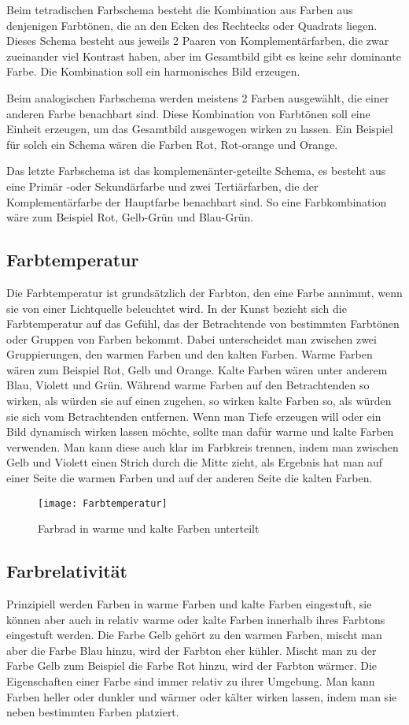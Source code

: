 Beim tetradischen Farbschema besteht die Kombination aus Farben aus denjenigen Farbtönen, die an den Ecken des Rechtecks oder Quadrats liegen. Dieses Schema besteht aus jeweils 2 Paaren von Komplementärfarben, die zwar zueinander viel Kontrast haben, aber im Gesamtbild gibt es keine sehr dominante Farbe. Die Kombination soll ein harmonisches Bild erzeugen.

Beim analogischen Farbschema werden meistens 2 Farben ausgewählt, die einer anderen Farbe benachbart sind. Diese Kombination von Farbtönen soll eine Einheit erzeugen, um das Gesamtbild ausgewogen wirken zu lassen. Ein Beispiel für solch ein Schema wären die Farben Rot, Rot-orange und Orange.

Das letzte Farbschema ist das komplemenänter-geteilte Schema, es besteht aus eine Primär -oder Sekundärfarbe und zwei Tertiärfarben, die der Komplementärfarbe der Hauptfarbe benachbart sind. So eine Farbkombination wäre zum Beispiel Rot, Gelb-Grün und Blau-Grün.
\cite{day2013line}

\subsection{Farbtemperatur}
Die Farbtemperatur ist grundsätzlich der Farbton, den eine Farbe annimmt, wenn sie von einer Lichtquelle beleuchtet wird. In der Kunst bezieht sich die Farbtemperatur auf das Gefühl, das der Betrachtende von bestimmten Farbtönen oder Gruppen von Farben bekommt. Dabei unterscheidet man zwischen zwei Gruppierungen, den warmen Farben und den kalten Farben. Warme Farben wären zum Beispiel Rot, Gelb und Orange. Kalte Farben wären unter anderem Blau, Violett und Grün. Während warme Farben auf den Betrachtenden so wirken, als würden sie auf einen zugehen, so wirken kalte Farben so, als würden sie sich vom Betrachtenden entfernen. Wenn man Tiefe erzeugen will oder ein Bild dynamisch wirken lassen möchte, sollte man dafür warme und kalte Farben verwenden. Man kann diese auch klar im Farbkreis trennen, indem man zwischen Gelb und Violett einen Strich durch die Mitte zieht, als Ergebnis hat man auf einer Seite die warmen Farben und auf der anderen Seite die kalten Farben.
\cite{mollica2018special}

\begin{figure}[H]
	\centering
	\texttt{[image: Farbtemperatur]}
	\caption{Farbrad in warme und kalte Farben unterteilt\cite{mollica2018special}}
\end{figure}

\subsection{Farbrelativität}
Prinzipiell werden Farben in warme Farben und kalte Farben eingestuft, sie können aber auch in relativ warme oder kalte Farben innerhalb ihres Farbtons eingestuft werden. Die Farbe Gelb gehört zu den warmen Farben, mischt man aber die Farbe Blau hinzu, wird der Farbton eher kühler. Mischt man zu der Farbe Gelb zum Beispiel die Farbe Rot hinzu, wird der Farbton wärmer. Die Eigenschaften einer Farbe sind immer relativ zu ihrer Umgebung. Man kann Farben heller oder dunkler und wärmer oder kälter wirken lassen, indem man sie neben bestimmten Farben platziert.
\cite{mollica2018special}

